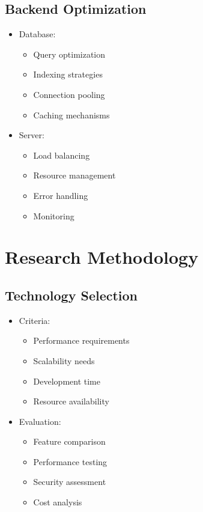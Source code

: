 \subsection{Backend Optimization}
\begin{itemize}
    \item Database:
    \begin{itemize}
        \item Query optimization
        \item Indexing strategies
        \item Connection pooling
        \item Caching mechanisms
    \end{itemize}
    \item Server:
    \begin{itemize}
        \item Load balancing
        \item Resource management
        \item Error handling
        \item Monitoring
    \end{itemize}
\end{itemize}

\section{Research Methodology}
\subsection{Technology Selection}
\begin{itemize}
    \item Criteria:
    \begin{itemize}
        \item Performance requirements
        \item Scalability needs
        \item Development time
        \item Resource availability
    \end{itemize}
    \item Evaluation:
    \begin{itemize}
        \item Feature comparison
        \item Performance testing
        \item Security assessment
        \item Cost analysis
    \end{itemize}
\end{itemize}


